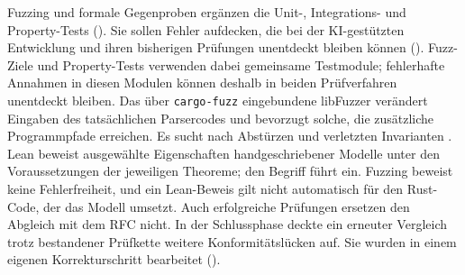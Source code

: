 Fuzzing und formale Gegenproben ergänzen die Unit-, Integrations- und Property-Tests
(). Sie sollen Fehler aufdecken, die bei der KI-gestützten Entwicklung und
ihren bisherigen Prüfungen unentdeckt bleiben können (). Fuzz-Ziele und
Property-Tests verwenden dabei gemeinsame Testmodule; fehlerhafte Annahmen in diesen Modulen können deshalb
in beiden Prüfverfahren unentdeckt bleiben.
Das über \texttt{cargo-fuzz} eingebundene libFuzzer verändert Eingaben
des tatsächlichen Parsercodes und bevorzugt solche, die zusätzliche Programmpfade erreichen.
Es sucht nach Abstürzen und verletzten Invarianten \cite{libfuzzer}. Lean beweist ausgewählte Eigenschaften
handgeschriebener Modelle unter den Voraussetzungen der jeweiligen Theoreme; den Begriff führt
 ein. Fuzzing beweist keine Fehlerfreiheit, und ein Lean-Beweis gilt nicht
automatisch für den Rust-Code, der das Modell umsetzt. Auch erfolgreiche Prüfungen ersetzen den Abgleich
mit dem RFC nicht. In der Schlussphase deckte ein erneuter Vergleich trotz bestandener Prüfkette weitere
Konformitätslücken auf. Sie wurden in einem eigenen Korrekturschritt bearbeitet ().

